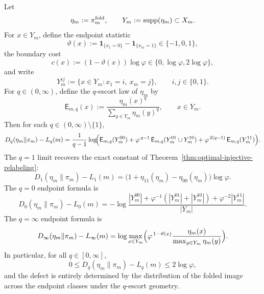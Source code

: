 \begin{theorem}
\label{thm:full-renyi-defect-formula}
Let
\[
\eta_m:=\pi_m^{\mathrm{fold}},\qquad Y_m:=\operatorname{supp}(\eta_m)\subset X_m.
\]
For \(x\in Y_m\), define the endpoint statistic
\[
\vartheta(x):=\mathbf{1}_{\{x_1=0\}}-\mathbf{1}_{\{x_m=1\}}\in\{-1,0,1\},
\]
the boundary cost
\[
c(x):=(1-\vartheta(x))\log\varphi\in\{0,\log\varphi,2\log\varphi\},
\]
and write
\[
Y_m^{ij}:=\{x\in Y_m:x_1=i,\ x_m=j\},\qquad i,j\in\{0,1\}.
\]
For \(q\in(0,\infty)\), define the \(q\)-escort law of \(\eta_m\) by
\[
\mathsf{E}_{m,q}(x):=\frac{\eta_m(x)^q}{\sum_{y\in Y_m}\eta_m(y)^q},
\qquad x\in Y_m.
\]
Then for each \(q\in(0,\infty)\setminus\{1\}\),
\begin{equation}\label{eq:escort-defect}
D_q(\eta_m\|\pi_m)-L_q(m)
=
\frac{1}{q-1}
\log\!\Bigl(
\mathsf{E}_{m,q}(Y_m^{00})
+\varphi^{\,q-1}\,\mathsf{E}_{m,q}(Y_m^{01}\cup Y_m^{10})
+\varphi^{\,2(q-1)}\,\mathsf{E}_{m,q}(Y_m^{11})
\Bigr).
\end{equation}
The \(q=1\) limit recovers the exact constant of
Theorem~\ref{thm:optimal-injective-relabeling}:
\begin{equation}\label{eq:defect-q1}
D_1(\eta_m\|\pi_m)-L_1(m)
=
\bigl(1+\eta_{11}(\eta_m)-\eta_{00}(\eta_m)\bigr)\log\varphi.
\end{equation}
The \(q=0\) endpoint formula is
\begin{equation}\label{eq:defect-q0}
D_0(\eta_m\|\pi_m)-L_0(m)
=
-\log\frac{|Y_m^{00}|+\varphi^{-1}(|Y_m^{01}|+|Y_m^{10}|)
+\varphi^{-2}|Y_m^{11}|}{|Y_m|}.
\end{equation}
The \(q=\infty\) endpoint formula is
\begin{equation}\label{eq:defect-qinfty}
D_\infty(\eta_m\|\pi_m)-L_\infty(m)
=
\log\max_{x\in Y_m}
\Bigl(
\varphi^{\,1-\vartheta(x)}
\frac{\eta_m(x)}{\max_{y\in Y_m}\eta_m(y)}
\Bigr).
\end{equation}
In particular, for all \(q\in[0,\infty]\),
\[
0\le D_q(\eta_m\|\pi_m)-L_q(m)\le 2\log\varphi,
\]
and the defect is entirely determined by the distribution of the folded image
across the endpoint classes under the \(q\)-escort geometry.
\end{theorem}

